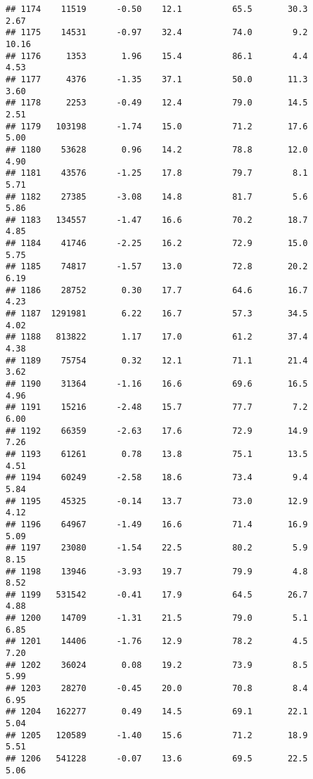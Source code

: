 \documentclass[
]{article}
\begin{document}
\begin{verbatim}
## 1174    11519      -0.50    12.1          65.5       30.3              2.67
## 1175    14531      -0.97    32.4          74.0        9.2             10.16
## 1176     1353       1.96    15.4          86.1        4.4              4.53
## 1177     4376      -1.35    37.1          50.0       11.3              3.60
## 1178     2253      -0.49    12.4          79.0       14.5              2.51
## 1179   103198      -1.74    15.0          71.2       17.6              5.00
## 1180    53628       0.96    14.2          78.8       12.0              4.90
## 1181    43576      -1.25    17.8          79.7        8.1              5.71
## 1182    27385      -3.08    14.8          81.7        5.6              5.86
## 1183   134557      -1.47    16.6          70.2       18.7              4.85
## 1184    41746      -2.25    16.2          72.9       15.0              5.75
## 1185    74817      -1.57    13.0          72.8       20.2              6.19
## 1186    28752       0.30    17.7          64.6       16.7              4.23
## 1187  1291981       6.22    16.7          57.3       34.5              4.02
## 1188   813822       1.17    17.0          61.2       37.4              4.38
## 1189    75754       0.32    12.1          71.1       21.4              3.62
## 1190    31364      -1.16    16.6          69.6       16.5              4.96
## 1191    15216      -2.48    15.7          77.7        7.2              6.00
## 1192    66359      -2.63    17.6          72.9       14.9              7.26
## 1193    61261       0.78    13.8          75.1       13.5              4.51
## 1194    60249      -2.58    18.6          73.4        9.4              5.84
## 1195    45325      -0.14    13.7          73.0       12.9              4.12
## 1196    64967      -1.49    16.6          71.4       16.9              5.09
## 1197    23080      -1.54    22.5          80.2        5.9              8.15
## 1198    13946      -3.93    19.7          79.9        4.8              8.52
## 1199   531542      -0.41    17.9          64.5       26.7              4.88
## 1200    14709      -1.31    21.5          79.0        5.1              6.85
## 1201    14406      -1.76    12.9          78.2        4.5              7.20
## 1202    36024       0.08    19.2          73.9        8.5              5.99
## 1203    28270      -0.45    20.0          70.8        8.4              6.95
## 1204   162277       0.49    14.5          69.1       22.1              5.04
## 1205   120589      -1.40    15.6          71.2       18.9              5.51
## 1206   541228      -0.07    13.6          69.5       22.5              5.06

\end{verbatim}
\end{document}

